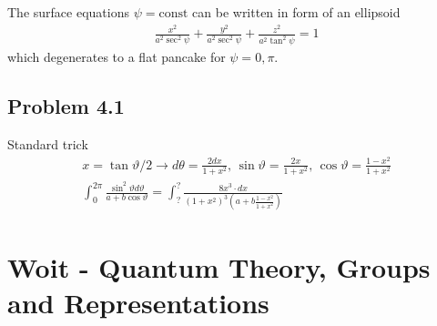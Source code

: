 \documentclass[10pt,a4paper]{book}
\theoremstyle{definition}
\begin{document}
The surface equations $\psi=\text{const}$ can be written in form of an ellipsoid
\begin{align}
    \frac{x^2}{a^2\sec^2\psi}+\frac{y^2}{a^2\sec^2\psi}+\frac{z^2}{a^2\tan^2\psi}=1
\end{align}
which degenerates to a flat pancake for $\psi=0,\pi$.

\subsection{Problem 4.1}
Standard trick
\begin{align}
    x=\tan\vartheta/2\rightarrow d\theta =\frac{2dx}{1+x^2},\,\sin\vartheta=\frac{2x}{1+x^2},\,\cos\vartheta=\frac{1-x^2}{1+x^2}\\
    \int_0^{2\pi}\frac{\sin^2\vartheta d\vartheta}{a+b\cos\vartheta}=\int_?^{?}\frac{8x^3\cdot dx}{(1+x^2)^3(a+b\frac{1-x^2}{1+x^2})}
\end{align}

\section{{\sc Woit} - Quantum Theory, Groups and Representations}
\end{document}
